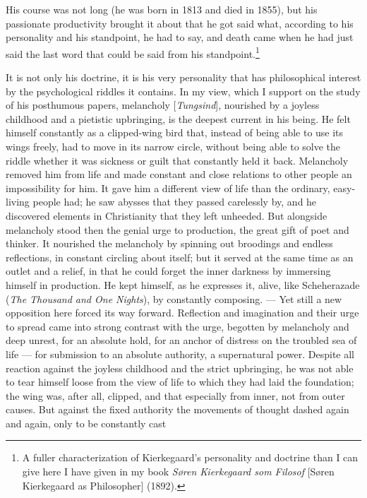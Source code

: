 \documentclass[12pt,a4paper]{book}
\newcommand{\opage}[1]{\marginnote{\footnotesize\textit{[#1]}}}
\begin{document}
His course was not long (he was born in 1813 and died in 1855), but his passionate
productivity brought it about that he got said what, according to his personality and his
standpoint, he had to say, and death came when he had just said the last word that could be
said from his standpoint.\footnote{A fuller characterization of Kierkegaard's personality
and doctrine than I can give here I have given in my book \emph{Søren Kierkegaard som
Filosof} [Søren Kierkegaard as Philosopher] (1892).}

It is not only his doctrine, it is his very personality that has philosophical interest by
the psychological riddles it contains. In my view, which I support on \opage{149}the study of his
posthumous papers, melancholy [\emph{Tungsind}], nourished by a joyless childhood and a
pietistic upbringing, is the deepest current in his being. He felt himself constantly as a
clipped-wing bird that, instead of being able to use its wings freely, had to move in its
narrow circle, without being able to solve the riddle whether it was sickness or guilt that
constantly held it back. Melancholy removed him from life and made constant and close
relations to other people an impossibility for him. It gave him a different view of life
than the ordinary, easy-living people had; he saw abysses that they passed carelessly by,
and he discovered elements in Christianity that they left unheeded. But alongside melancholy
stood then the genial urge to production, the great gift of poet and thinker. It nourished
the melancholy by spinning out broodings and endless reflections, in constant circling
about itself; but it served at the same time as an outlet and a relief, in that he could
forget the inner darkness by immersing himself in production. He kept himself, as he
expresses it, alive, like Scheherazade (\emph{The Thousand and One Nights}), by constantly
composing. --- Yet still a new opposition here forced its way forward. Reflection and
imagination and their urge to spread came into strong contrast with the urge, begotten by
melancholy and deep unrest, for an absolute hold, for an anchor of distress on the troubled
sea of life --- for submission to an absolute authority, a supernatural power. Despite all
reaction against the joyless childhood and the strict upbringing, he was not able to tear
himself loose from the view of life to which they had laid the foundation; the wing was,
after all, clipped, and that especially from inner, not from outer causes. But against the
fixed authority the movements of thought dashed again and again, only to be constantly cast
\end{document}
